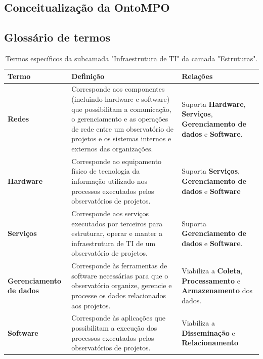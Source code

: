 \begin{apendicesenv}

\chapter{Conceitualização da OntoMPO}
\label{ap:conceitualizacao}

\section{Glossário de termos}

\begin{table}[H]
\centering
\caption{Termos específicos da subcamada "Infraestrutura de TI" da camada "Estruturas".}
\begin{tabularx}{\textwidth}{|l|X|X|}
\hline
\textbf{Termo} & \textbf{Definição} & \textbf{Relações} \\ \hline
\textbf{Redes}   & Corresponde aos componentes (incluindo hardware e software) que possibilitam a comunicação, o gerenciamento e as operações de rede entre um observatório de projetos e os
sistemas internos e externos das organizações. & Suporta \textbf{Hardware}, \textbf{Serviços}, \textbf{Gerenciamento de dados} e \textbf{Software}.\\ \hline
\textbf{Hardware}   & Corresponde ao equipamento físico de tecnologia da informação utilizado nos processos executados pelos observatórios de projetos. & Suporta \textbf{Serviços}, \textbf{Gerenciamento de dados} e \textbf{Software}\\ \hline
\textbf{Serviços}   & Corresponde aos serviços executados por terceiros para estruturar, operar e manter a infraestrutura de TI de um observatório de projetos. & Suporta \textbf{Gerenciamento de dados} e \textbf{Software}.\\ \hline
\textbf{Gerenciamento de dados}   & Corresponde às ferramentas de software necessárias para que o observatório organize, gerencie e processe os dados relacionados aos projetos.
 & Viabiliza a \textbf{Coleta}, \textbf{Processamento} e \textbf{Armazenamento} dos dados. \\ \hline
\textbf{Software}  & Corresponde às aplicações que possibilitam a execução dos processos executados pelos observatórios de projetos. & Viabiliza a \textbf{Disseminação} e \textbf{Relacionamento} \\ \hline
\end{tabularx}
\end{table}


\end{apendicesenv}
